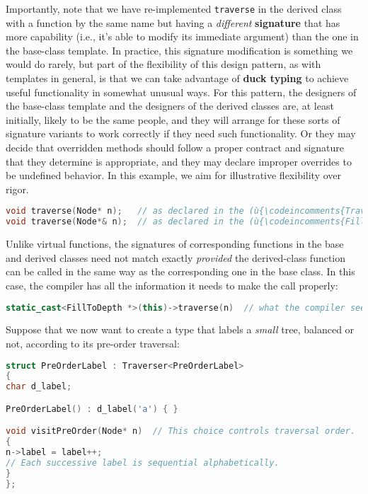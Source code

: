 Importantly, note that we have re-implemented \texttt{traverse} in the
derived class with a function by the same name but having a
\emph{different} \textbf{signature} that has more capability (i.e., it's able
to modify its immediate argument) than the one in the base-class
template. In practice, this signature modification is something we would
do rarely, but part of the flexibility of this design pattern, as with
templates in general, is that we can take advantage of \textbf{duck
typing} to achieve useful functionality in somewhat unusual ways. For
this pattern, the designers of the base-class template and the designers
of the derived classes are, at least initially, likely to be the same
people, and they will arrange for these sorts of signature variants to
work correctly if they need such functionality. Or they may decide that
overridden methods should follow a proper contract and signature that
they determine is appropriate, and they may declare improper overrides
to be undefined behavior. In this example, we aim for illustrative
flexibility over rigor.

\begin{lstlisting}[language=C++]
void traverse(Node* n);   // as declared in the (ù{\codeincomments{Traverser}}ù) base-class template
void traverse(Node*& n);  // as declared in the (ù{\codeincomments{FillToDepth}}ù) derived class
\end{lstlisting}

\noindent Unlike virtual functions, the signatures of corresponding functions in
the base and derived classes need not match exactly \emph{provided} the
derived-class function can be called in the same way as the
corresponding one in the base class. In this case, the compiler has all
the information it needs to make the call properly:

\begin{lstlisting}[language=C++]
static_cast<FillToDepth *>(this)->traverse(n)  // what the compiler sees
\end{lstlisting}

\noindent Suppose that we now want to create a type that labels a \emph{small}
tree, balanced or not, according to its pre-order traversal:

\begin{lstlisting}[language=C++]
struct PreOrderLabel : Traverser<PreOrderLabel>
{
char d_label;

PreOrderLabel() : d_label('a') { }

void visitPreOrder(Node* n)  // This choice controls traversal order.
{
n->label = label++;
// Each successive label is sequential alphabetically.
}
};
\end{lstlisting}

